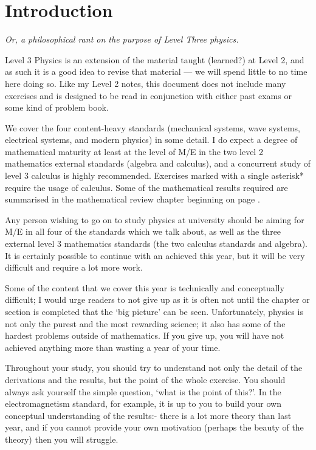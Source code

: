 \documentclass[a4paper]{amsbook}
\newcommand{\marginsymbol}{}
\theoremstyle{definition}
\numberwithin{exercise}{chapter}
\numberwithin{exercise}{chapter}
\begin{document}
\setcounter{page}{6}

\tableofcontents

\chapter*{Introduction}
\begin{center}
  \emph{Or, a philosophical rant on the purpose of Level Three physics.}
\end{center}
Level 3 Physics is an extension of the material taught (learned?) at Level 2, and as such it
is a good idea to revise that material --- we will spend little to no time here doing so. Like
my Level 2 notes, this document does not include many exercises and is designed to be read in
conjunction with either past exams or some kind of problem book.

We cover the four content-heavy standards (mechanical systems, wave systems, electrical systems,
and modern physics) in some detail. I do expect a degree of mathematical maturity at least at the
level of M/E in the two level 2 mathematics external standards (algebra and calculus), and a concurrent
study of level 3 calculus is highly recommended. Exercises marked with a single asterisk* require
the usage of calculus. Some of the mathematical results required are summarised in the mathematical
review chapter beginning on page \pageref{chap:review}.

Any person wishing to go on to study physics at university should be aiming for M/E in all four of
the standards which we talk about, as well as the three external level 3 mathematics standards (the two
calculus standards and algebra). It is certainly possible to continue with an achieved this year, but
it will be very difficult and require a lot more work.

Some of the content that we cover this year is technically and conceptually difficult; I would urge
readers to not give up as it is often not until the chapter or section is completed that the `big
picture' can be seen. Unfortunately, physics is not only the purest and the most rewarding science;
it also has some of the hardest problems outside of mathematics. If you give up, you will have not
achieved anything more than wasting a year of your time.

\marginsymbol Throughout your study, you should try to understand not only the detail of the derivations and the results,
but the point of the whole exercise. You should always ask yourself the simple question, `what is the point
of this?'. In the electromagnetism standard, for example, it is up to you to build your own conceptual
understanding of the results:- there is a lot more theory than last year, and if you cannot provide your
own motivation (perhaps the beauty of the theory) then you will struggle.
\end{document}
